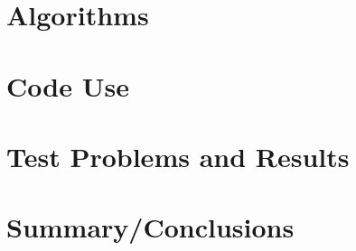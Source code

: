 \documentclass[10pt]{article}
\begin{document}
\lipsum[2] 







\section{Algorithms}

\lipsum[3] 







\section{Code Use}

\lipsum[4] 







\section{Test Problems and Results}

\lipsum[5] 







\section{Summary/Conclusions}

\lipsum[6] 








\end{document}
